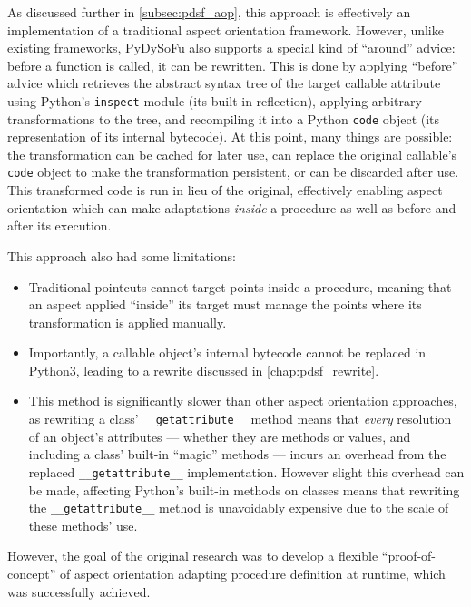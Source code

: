 As discussed further in \cref{subsec:pdsf_aop}, this approach is effectively an
implementation of a traditional aspect orientation framework. However, unlike
existing frameworks, PyDySoFu also supports a special kind of ``around'' advice:
before a function is called, it can be rewritten. This is done by applying
``before'' advice which retrieves the abstract syntax tree of the target
callable attribute using Python's \lstinline{inspect} module (its built-in
reflection), applying arbitrary transformations to the tree, and recompiling it
into a Python \lstinline{code} object (its representation of its
internal bytecode). At this point, many things are possible: the transformation
can be cached for later use, can replace the original callable's
\lstinline{code} object to make the transformation persistent, or can be
discarded after use. This transformed code is run in lieu of the original,
effectively enabling aspect orientation which can make adaptations \emph{inside}
a procedure as well as before and after its execution.

This approach also had some limitations:

\begin{itemize}
    \item Traditional pointcuts cannot target points inside a procedure, meaning
    that an aspect applied ``inside'' its target must manage the points where
    its transformation is applied manually.
    \item Importantly, a callable object's internal bytecode cannot be replaced
    in Python3, leading to a rewrite discussed in \cref{chap:pdsf_rewrite}.
    \item This method is significantly slower than other aspect orientation
    approaches, as rewriting a class' \lstinline{__getattribute__} method means
    that \emph{every} resolution of an object's attributes --- whether they are
    methods or values, and including a class' built-in ``magic'' methods ---
    incurs an overhead from the replaced \lstinline{__getattribute__}
    implementation. However slight this overhead can be made, affecting Python's
    built-in methods on classes means that rewriting the
    \lstinline{__getattribute__} method is unavoidably expensive due to the
    scale of these methods' use.
\end{itemize}

However, the goal of the original research was to develop a flexible
``proof-of-concept'' of aspect orientation adapting procedure definition at
runtime, which was successfully
achieved\cite{wallis2018caise,wallis2018genetic}. 


